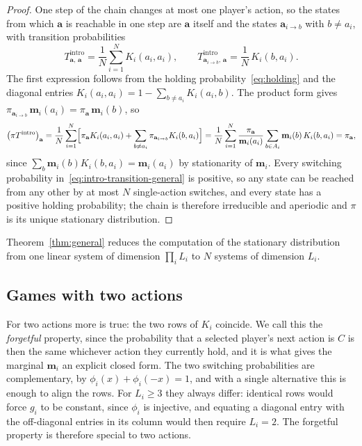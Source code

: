 \documentclass[11pt]{article}
\newcommand{\bfa}{\mathbf{a}}
\newcommand{\bfm}{\mathbf{m}}
\newcommand{\intro}{\mathrm{intro}}
\begin{document}
\begin{proof}

One step of the chain changes at most one player's action, so the states
from which \(\bfa\) is reachable in one step are \(\bfa\) itself and the
states \(\bfa_{i\to b}\) with \(b\neq a_i\), with transition probabilities
\[
  T^{\intro}_{\bfa,\,\bfa} = \frac{1}{N}\sum_{i=1}^{N} K_i(a_i,a_i),
  \qquad
  T^{\intro}_{\bfa_{i\to b},\,\bfa} = \frac{1}{N}\,K_i(b,a_i).
\]
The first expression follows from the holding
probability~\eqref{eq:holding} and the diagonal entries
\(K_i(a_i,a_i)=1-\sum_{b\neq a_i}K_i(a_i,b)\).
The product form gives
\(\pi_{\bfa_{i\to b}}\,\bfm_i(a_i)=\pi_{\bfa}\,\bfm_i(b)\), so
\[
  \bigl(\pi T^{\intro}\bigr)_{\bfa}
  = \frac{1}{N}\sum_{i=1}^{N}
    \Bigl[\pi_{\bfa}K_i(a_i,a_i)
      +\sum_{b\neq a_i}\pi_{\bfa_{i\to b}}K_i(b,a_i)\Bigr]
  = \frac{1}{N}\sum_{i=1}^{N}\frac{\pi_{\bfa}}{\bfm_i(a_i)}
    \sum_{b\in A_i} \bfm_i(b)\,K_i(b,a_i)
  = \pi_{\bfa},
\]
since \(\sum_{b} \bfm_i(b)K_i(b,a_i)=\bfm_i(a_i)\) by stationarity of \(\bfm_i\).
Every switching probability in~\eqref{eq:intro-transition-general} is
positive, so any state can be reached from any other by at most \(N\)
single-action switches, and every state has a positive holding probability;
the chain is therefore irreducible and aperiodic and \(\pi\) is its unique
stationary distribution.

\end{proof}

Theorem~\ref{thm:general} reduces the computation of the stationary
distribution from one linear system of dimension \(\prod_i L_i\) to \(N\)
systems of dimension \(L_i\).

\subsection{Games with two actions}\label{sec:two-actions}

For two actions more is true: the two rows of \(K_i\) coincide. We call
this the \emph{forgetful} property, since the probability that a selected
player's next action is \(C\) is then the same whichever action they
currently hold, and it is what gives the marginal \(\bfm_i\) an explicit
closed form. The two switching probabilities are complementary, by
\(\phi_i(x)+\phi_i(-x)=1\), and with a single alternative this is enough to
align the rows. For \(L_i\ge3\) they always differ: identical rows would
force \(g_i\) to be constant, since \(\phi_i\) is injective, and equating a
diagonal entry with the off-diagonal entries in its column would then
require \(L_i=2\). The forgetful property is therefore special to two
actions.
\end{document}
